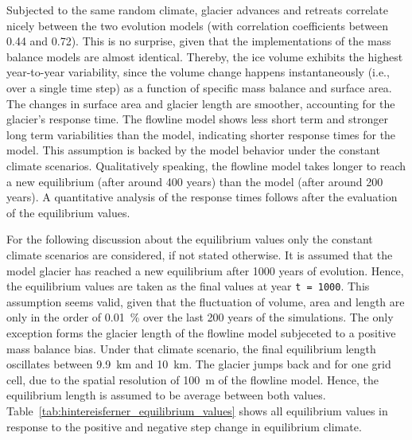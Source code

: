     Subjected to the same random climate, glacier advances and retreats correlate nicely between the two evolution models (with correlation coefficients between 0.44 and 0.72). This is no surprise, given that the implementations of the mass balance models are almost identical. Thereby, the ice volume exhibits the highest year-to-year variability, since the volume change happens instantaneously (i.e., over a single time step) as a function of specific mass balance and surface area. The changes in surface area and glacier length are smoother, accounting for the glacier's response time. The flowline model shows less short term and stronger long term variabilities than the \vas{} model, indicating shorter response times for the \vas{} model. This assumption is backed by the model behavior under the constant climate scenarios. Qualitatively speaking, the flowline model takes longer to reach a new equilibrium (after around 400 years) than the \vas{} model (after around 200 years). A quantitative analysis of the response times follows after the evaluation of the equilibrium values.


    For the following discussion about the equilibrium values only the constant climate scenarios are considered, if not stated otherwise. It is assumed that the model glacier has reached a new equilibrium after 1000 years of evolution. Hence, the equilibrium values are taken as the final values at year \lstinline`t = 1000`. This assumption seems valid, given that the fluctuation of volume, area and length are only in the order of \SI{0.01}{\percent} over the last 200 years of the simulations. The only exception forms the glacier length of the flowline model subjeceted to a positive mass balance bias. Under that climate scenario, the final equilibrium length oscillates between \SI{9.9}{\kilo\meter} and \SI{10}{\kilo\meter}. The glacier jumps back and for one grid cell, due to the spatial resolution of \SI{100}{\meter} of the flowline model. Hence, the equilibrium length is assumed to be average between both values. Table~\ref{tab:hintereisferner_equilibrium_values} shows all equilibrium values in response to the positive and negative step change in equilibrium climate.
    
